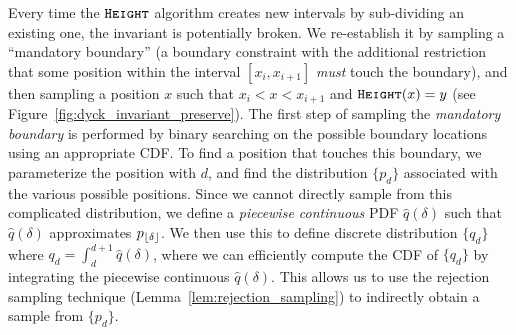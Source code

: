 Every time the $\texttt{\textsc{Height}}$ algorithm creates new intervals by sub-dividing an existing one, the invariant is potentially broken.
We re-establish it by sampling a ``mandatory boundary''
(a boundary constraint with the additional restriction that some position within the interval $[x_i,x_{i+1}]$ \emph{must} touch the boundary),
and then sampling a position $x$ such that $x_i < x < x_{i+1}$ and $\texttt{\textsc{Height}}(x) = y$ (see Figure~\ref{fig:dyck_invariant_preserve}).
The first step of sampling the \emph{mandatory boundary} is performed by binary searching on the possible boundary locations using an appropriate CDF.
To find a position that touches this boundary, we parameterize the position with $d$,
and find the distribution $\{p_d\}$ associated with the various possible positions.
Since we cannot directly sample from this complicated distribution,
we define a \emph{piecewise continuous} PDF $\hat q(\delta)$ such that $\hat q(\delta)$ approximates $p_{\lfloor\delta\rfloor}$.
We then use this to define discrete distribution $\{q_d\}$ where $q_d = \int_d^{d+1}\hat q(\delta)$,
where we can efficiently compute the CDF of $\{q_d\}$ by integrating the piecewise continuous $\hat q(\delta)$.
This allows us to use the rejection sampling technique (Lemma~\ref{lem:rejection_sampling}) to indirectly obtain a sample from $\{p_d\}$.
